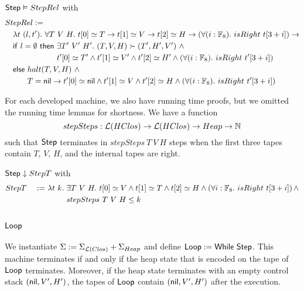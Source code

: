 \begin{lemma}
  \label{lem:Step_Realise}
  $\mathsf{Step} \mathrel{\vDash} StepRel$ with
  \begin{alignat*}{1}
    & StepRel := \\
    &\quad \lambda t~(l, t').~\forall T~V~H.~ t[0] \simeq T \rightarrow t[1] \simeq V \rightarrow t[2] \simeq H \rightarrow \left(\forall (i:\Fin_8).~isRight~t[3+i]\right) \rightarrow \\
    &\quad \MS{if}~l=\None~\MS{then}~\exists T'~V'~H'.~(T,V,H) \red (T',H',V') ~\land~ \\
    &\quad \phantom{\MS{if}~l=\None~\MS{then}}~ t'[0] \simeq T' \land t'[1] \simeq V' \land t'[2] \simeq H' \land \left(\forall (i:\Fin_8).~isRight~t'[3+i]\right) \\
    &\quad \MS{else}~ halt(T,V,H) ~\land~ \\
    &\quad \phantom{\MS{else}}~T=\nil \rightarrow t'[0] \simeq \nil \land t'[1] \simeq V \land t'[2] \simeq H \land \left(\forall (i:\Fin_8).~isRight~t'[3+i]\right)
  \end{alignat*}
\end{lemma}

For each developed machine, we also have running time proofs, but we omitted the running time lemmas for shortness.  We have a function
\[
  stepSteps : \mathcal{L}(HClos) \rightarrow \mathcal{L}(HClos) \rightarrow Heap \rightarrow \mathbb{N}
\]
such that $\mathsf{Step}$ terminates in $stepSteps~T~V~H$ steps when the first three tapes contain $T$, $V$, $H$, and the internal tapes are right.
\begin{lemma}
  \label{lem:Step_Terminates}
  $\mathsf{Step} \mathrel{\downarrow} StepT$ with
  \begin{alignat*}{3}
    & StepT &~:=~& \lambda t~k.~\exists T~V~H.~t[0] \simeq V \land t[1] \simeq T \land t[2] \simeq H \land \left(\forall i:\mathbb{F}_8.~isRight~t[3+i]\right) \land \\
    &       &    & \phantom{\lambda t~k.}~stepSteps~T~V~H \leq k
  \end{alignat*}
\end{lemma}


\subsection{$\mathsf{Loop}$}
\label{sec:heap-Loop}
%

We instantiate $\Sigma := \Sigma_{\mathcal{L}(Clos)} + \Sigma_{Heap}$ and define $\mathsf{Loop} := \mathsf{While}~\mathsf{Step}$.  This machine terminates if and only if
the heap state that is encoded on the tape of $\mathsf{Loop}$ terminates.  Moreover, if the heap state terminates with an empty control stack
$(\mathsf{nil}, V', H')$, the tapes of $\mathsf{Loop}$ contain $(\mathsf{nil}, V', H')$ after the execution.

